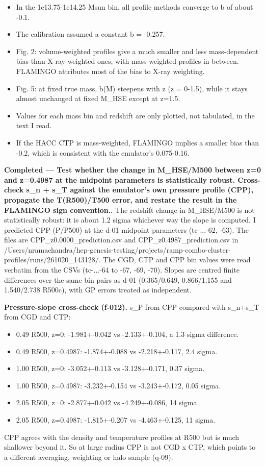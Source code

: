 \documentclass[11pt,a4paper]{article}
\begin{document}
\begin{itemize}
  \item In the 1e13.75-1e14.25 Msun bin, all profile methods converge to b of about -0.1.
  \item The calibration assumed a constant b = -0.257.
  \item Fig. 2: volume-weighted profiles give a much smaller and less mass-dependent bias than X-ray-weighted ones, with mass-weighted profiles in between. FLAMINGO attributes most of the bias to X-ray weighting.
  \item Fig. 5: at fixed true mass, b(M) steepens with z (z = 0-1.5), while it stays almost unchanged at fixed M\_HSE except at z=1.5.
  \item Values for each mass bin and redshift are only plotted, not tabulated, in the text I read.
  \item If the HACC CTP is mass-weighted, FLAMINGO implies a smaller bias than -0.2, which is consistent with the emulator's 0.075-0.16.
\end{itemize}
\textbf{Completed --- Test whether the change in M\_HSE/M500 between z=0 and z=0.4987 at the midpoint parameters is statistically robust. Cross-check s\_n + s\_T against the emulator's own pressure profile (CPP), propagate the T(R500)/T500 error, and restate the result in the FLAMINGO sign convention..} The redshift change in M\_HSE/M500 is not statistically robust: it is about 1.2 sigma whichever way the slope is computed. I predicted CPP (P/P500) at the d-01 midpoint parameters (tc-...-62, -63). The files are CPP\_z0.0000\_prediction.csv and CPP\_z0.4987\_prediction.csv in /Users/nramachandra/hep-genesis-testing/projects/ramp-combo-cluster-profiles/runs/261020\_143128/. The CGD, CTP and CPP bin values were read verbatim from the CSVs (tc-...-64 to -67, -69, -70). Slopes are centred finite differences over the same bin pairs as d-01 (0.365/0.649, 0.866/1.155 and 1.540/2.738 R500c), with GP errors treated as independent.

\textbf{Pressure-slope cross-check (f-012).} s\_P from CPP compared with s\_n+s\_T from CGD and CTP:

\begin{itemize}
  \item 0.49 R500, z=0: -1.981+-0.042 vs -2.133+-0.104, a 1.3 sigma difference.
  \item 0.49 R500, z=0.4987: -1.874+-0.088 vs -2.218+-0.117, 2.4 sigma.
  \item 1.00 R500, z=0: -3.052+-0.113 vs -3.128+-0.171, 0.37 sigma.
  \item 1.00 R500, z=0.4987: -3.232+-0.154 vs -3.243+-0.172, 0.05 sigma.
  \item 2.05 R500, z=0: -2.877+-0.042 vs -4.249+-0.086, 14 sigma.
  \item 2.05 R500, z=0.4987: -1.815+-0.207 vs -4.463+-0.125, 11 sigma.
\end{itemize}
CPP agrees with the density and temperature profiles at R500 but is much shallower beyond it. So at large radius CPP is not CGD x CTP, which points to a different averaging, weighting or halo sample (q-09).
\end{document}
